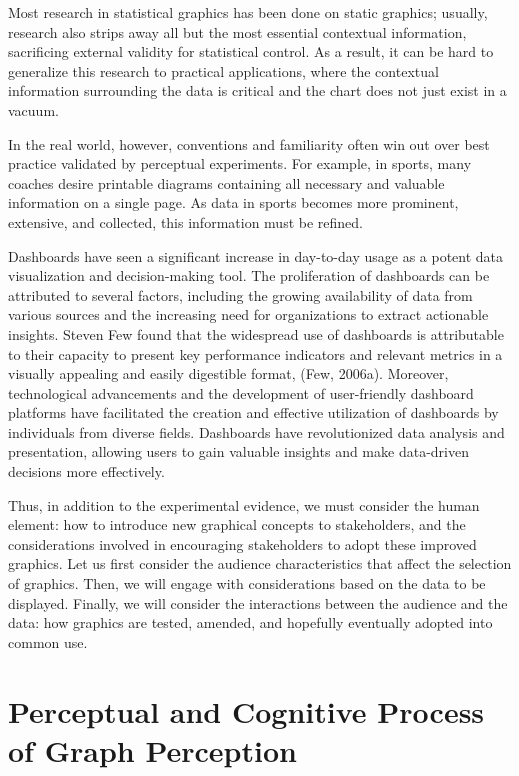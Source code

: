 \documentclass[print]{nuthesis}
\begin{document}
Most research in statistical graphics has been done on static graphics; usually, research also strips away all but the most essential contextual information, sacrificing external validity for statistical control.
As a result, it can be hard to generalize this research to practical applications, where the contextual information surrounding the data is critical and the chart does not just exist in a vacuum.

In the real world, however, conventions and familiarity often win out over best practice validated by perceptual experiments.
For example, in sports, many coaches desire printable diagrams containing all necessary and valuable information on a single page.
As data in sports becomes more prominent, extensive, and collected, this information must be refined.

Dashboards have seen a significant increase in day-to-day usage as a potent data visualization and decision-making tool.
The proliferation of dashboards can be attributed to several factors, including the growing availability of data from various sources and the increasing need for organizations to extract actionable insights.
Steven Few found that the widespread use of dashboards is attributable to their capacity to present key performance indicators and relevant metrics in a visually appealing and easily digestible format, (Few, 2006a).
Moreover, technological advancements and the development of user-friendly dashboard platforms have facilitated the creation and effective utilization of dashboards by individuals from diverse fields.
Dashboards have revolutionized data analysis and presentation, allowing users to gain valuable insights and make data-driven decisions more effectively.

Thus, in addition to the experimental evidence, we must consider the human element: how to introduce new graphical concepts to stakeholders, and the considerations involved in encouraging stakeholders to adopt these improved graphics.
Let us first consider the audience characteristics that affect the selection of graphics.
Then, we will engage with considerations based on the data to be displayed.
Finally, we will consider the interactions between the audience and the data: how graphics are tested, amended, and hopefully eventually adopted into common use.

\hypertarget{perceptual-and-cognitive-process-of-graph-perception}{%
\section{Perceptual and Cognitive Process of Graph Perception}\label{perceptual-and-cognitive-process-of-graph-perception}}
\end{document}
